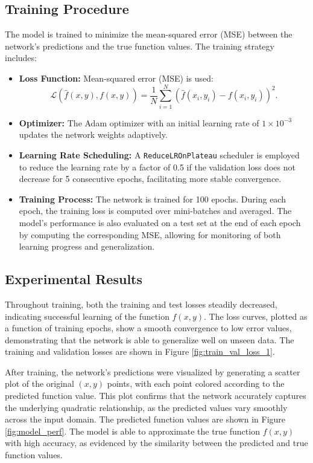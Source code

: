 \documentclass{article}
\begin{document}
\subsection*{Training Procedure}
The model is trained to minimize the mean-squared error (MSE) between the network's predictions and the true function values. The training strategy includes:
\begin{itemize}
    \item \textbf{Loss Function:}  
    Mean-squared error (MSE) is used:
    \[
    \mathcal{L}(\hat{f}(x,y), f(x,y)) = \frac{1}{N}\sum_{i=1}^{N} \left(\hat{f}(x_i,y_i) - f(x_i,y_i)\right)^2.
    \]
    \item \textbf{Optimizer:}  
    The Adam optimizer with an initial learning rate of \(1 \times 10^{-3}\) updates the network weights adaptively.
    \item \textbf{Learning Rate Scheduling:}  
    A \texttt{ReduceLROnPlateau} scheduler is employed to reduce the learning rate by a factor of 0.5 if the validation loss does not decrease for 5 consecutive epochs, facilitating more stable convergence.
    \item \textbf{Training Process:}  
    The network is trained for 100 epochs. During each epoch, the training loss is computed over mini-batches and averaged. The model's performance is also evaluated on a test set at the end of each epoch by computing the corresponding MSE, allowing for monitoring of both learning progress and generalization.
\end{itemize}

\subsection*{Experimental Results}
Throughout training, both the training and test losses steadily decreased, indicating successful learning of the function $f(x,y)$. The loss curves, plotted as a function of training epochs, show a smooth convergence to low error values, demonstrating that the network is able to generalize well on unseen data. The training and validation losses are shown in Figure \ref{fig:train_val_loss_1}.

After training, the network’s predictions were visualized by generating a scatter plot of the original $(x,y)$ points, with each point colored according to the predicted function value. This plot confirms that the network accurately captures the underlying quadratic relationship, as the predicted values vary smoothly across the input domain. The predicted function values are shown in Figure \ref{fig:model_perf}.
The model is able to approximate the true function $f(x,y)$ with high accuracy, as evidenced by the similarity between the predicted and true function values.
\end{document}
